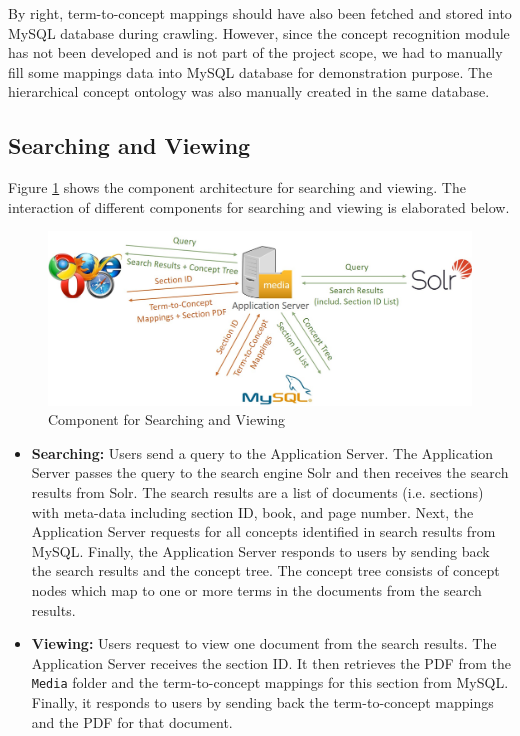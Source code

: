By right, term-to-concept mappings should have also been fetched and stored into MySQL database during crawling. However, since the concept recognition module has not been developed and is not part of the project scope, we had to manually fill some mappings data into MySQL database for demonstration purpose. The hierarchical concept ontology was also manually created in the same database.

\subsection{Searching and Viewing}
Figure \ref{fig:comp_search} shows the component architecture for searching and viewing. The interaction of different components for searching and viewing is elaborated below.

\begin{figure}[!htbp]
  \includegraphics[width=.9\textwidth]{proposed_methodology_and_system_specifications/component_searching.jpg}
  \caption{Component for Searching and Viewing}
  \label{fig:comp_search}
\end{figure}

\begin{itemize}
\item \textbf{Searching:} Users send a query to the Application Server. The Application Server passes the query to the search engine Solr and then receives the search results from Solr. The search results are a list of documents (i.e. sections) with meta-data including section ID, book, and page number. Next, the Application Server requests for all concepts identified in search results from MySQL. Finally, the Application Server responds to users by sending back the search results and the concept tree. The concept tree consists of concept nodes which map to one or more terms in the documents from the search results.

\item \textbf{Viewing:} Users request to view one document from the search results. The Application Server receives the section ID. It then retrieves the PDF from the \texttt{Media} folder and the term-to-concept mappings for this section from MySQL. Finally, it responds to users by sending back the term-to-concept mappings and the PDF for that document.
\end{itemize}
